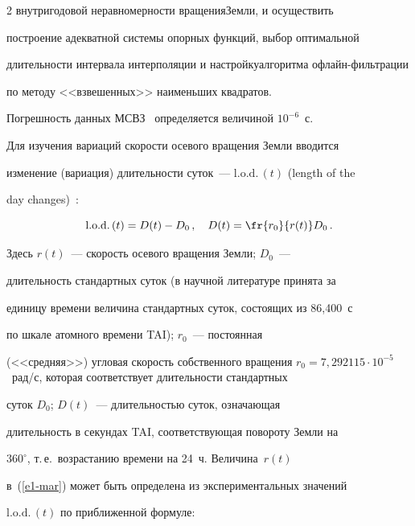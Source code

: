 \begin{multicols}{2}
внутригодовой неравномерности вращения\linebreak Земли, и осуществить


построение адекватной сис\-те\-мы опорных функций, выбор оптимальной


дли\-тель\-ности интервала интерполяции и настройку\linebreak алгоритма оф\-лайн-фильт\-ра\-ции 


по методу <<взвешенных>> наименьших квадратов.


Погрешность данных \mbox{МСВЗ}~\cite{6-mar} определяется величиной  $10^{-6}$~с.





Для изучения вариаций скорости осевого вращения Земли вводится


изменение (вариация) длительности суток~--- $\mathrm{l.o.d.}\, (t)$ (length of the


day changes)~\cite{7-mar}:


    \begin{equation}


    \mathrm{l.o.d.}\,(t)=D(t)-D_{0}\,, \quad D(t)=\fr{r_{0}}{r(t)}D_{0}\,.


    \label{e1-mar}


    \end{equation}


Здесь $r(t)$~--- скорость осевого вращения Земли; $D_{0}$~---


длительность стандартных суток (в научной литературе принята за


единицу времени величина стандартных суток, состоящих из 86,400~с 


по шкале атомного времени TAI);  $r_{0}$~--- постоянная


(<<средняя>>) угловая скорость собственного вращения $r_{0}=7{,}292115


\cdot 10^{-5}$~рад/с, которая соответствует длительности стандартных


суток $D_{0}$; $D(t)$~--- длительностью суток, означающая


длительность в секундах TAI, соответствующая повороту Земли на


$360^\circ$, т.\,е.\ возрастанию времени на 24~ч. Величина~$r(t)$


в~(\ref{e1-mar}) может быть определена из экспериментальных значений 


$\mathrm{l.o.d.}\,(t)$ по приближенной формуле:


    \begin{equation}



\end{equation}
\end{multicols}
